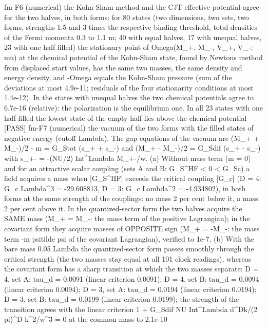 \documentclass[
  10pt,
]{article}
\newenvironment{Shaded}{}{}
\newcommand{\NormalTok}[1]{#1}
\begin{document}
\begin{Shaded}
\begin{Highlighting}[]
\NormalTok{[PASS] fm{-}F6  (numerical) the Kohn{-}Sham method and the CJT effective potential agree for the two halves, in both forms: for 80 states (two dimensions, two sets, two forms, strengths 1.5 and 3 times the respective binding threshold, total densities of the Fermi momenta 0.3 to 1.1 m; 40 with equal halves, 17 with unequal halves, 23 with one half filled) the stationary point of Omega(M\_+, M\_{-}, V\_+, V\_{-}; mu) at the chemical potential of the Kohn{-}Sham state, found by Newton\textquotesingle{}s method from displaced start values, has the same two masses, the same density and energy density, and {-}Omega equals the Kohn{-}Sham pressure (sum of the deviations at most 4.9e{-}11; residuals of the four stationarity conditions at most 1.4e{-}12). In the states with unequal halves the two chemical potentials agree to 6.7e{-}16 (relative): the polarization is the equilibrium one. In all 23 states with one half filled the lowest state of the empty half lies above the chemical potential}
\NormalTok{[PASS] fm{-}F7  (numerical) the vacuum of the two forms with the filled states of negative energy (cutoff Lambda). The gap equations of the vacuum are (M\_+ + M\_{-})/2 {-} m = G\_Stot (s\_+ + s\_{-}) and (M\_+ {-} M\_{-})/2 = G\_Sdif (s\_+ {-} s\_{-}) with s\_+{-} = {-}(NU/2) Int\^{}Lambda M\_+{-}/w. (a) Without mass term (m = 0) and for an attractive scalar coupling (sets A and B: G\_S\^{}HF \textless{} 0 \textless{} G\_Sc) a field acquires a mass when |G\_S\^{}HF| exceeds the critical coupling |G\_c| (D = 4: G\_c Lambda\^{}3 = {-}29.608813, D = 3: G\_c Lambda\^{}2 = {-}4.934802), in both forms at the same strength of the couplings: no mass 2 per cent below it, a mass 2 per cent above it. In the quantized{-}sector form the two halves acquire the SAME mass (M\_+ = M\_{-}: the mass term of the positive Lagrangian); in the covariant form they acquire masses of OPPOSITE sign (M\_+ = {-}M\_{-}: the mass term {-}m psitilde psi of the covariant Lagrangian), verified to 1e{-}7. (b) With the bare mass 0.05 Lambda the quantized{-}sector form passes smoothly through the critical strength (the two masses stay equal at all 101 clock readings), whereas the covariant form has a sharp transition at which the two masses separate: D = 4, set A: tau\_d = 0.0091 (linear criterion 0.0091); D = 4, set B: tau\_d = 0.0094 (linear criterion 0.0094); D = 3, set A: tau\_d = 0.0194 (linear criterion 0.0194); D = 3, set B: tau\_d = 0.0199 (linear criterion 0.0199); the strength of the transition agrees with the linear criterion 1 + G\_Sdif NU Int\^{}Lambda d\^{}Dk/(2 pi)\^{}D k\^{}2/w\^{}3 = 0 at the common mass to 2.1e{-}10}

\end{Highlighting}
\end{Shaded}
\end{document}
